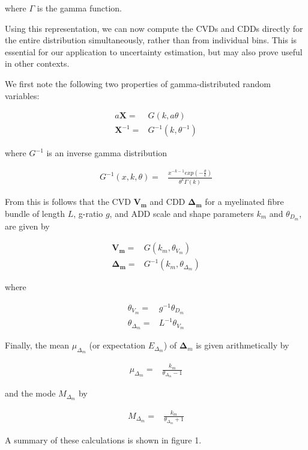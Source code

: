 where $\Gamma$ is the gamma function. 

Using this representation, we can now compute the CVDs and CDDs directly for the entire distribution simultaneously, rather than from individual bins. This is essential for our application to uncertainty estimation, but may also prove useful in other contexts.


We first note the following two properties of gamma-distributed random variables: 

\begin{eqnarray}
a \mathbf{X} =& G(k,a \theta ) \\
\mathbf{X}^{-1} =& G^{-1}(k,\theta^{-1} )
\end{eqnarray}

where $G^{-1}$ is an inverse gamma distribution

\begin{eqnarray}
G^{-1}(x,k,\theta) =& \frac{\displaystyle x^{-k-1} exp(- \frac{\displaystyle \theta}{ \displaystyle k})}{\displaystyle \theta^{k} \Gamma(k)} 
\end{eqnarray}

From this is follows that the CVD $\mathbf{V_m}$ and CDD $\mathbf{\Delta_m}$ for a myelinated fibre bundle of length $L$, g-ratio $g$, and ADD scale and shape parameters $k_m$ and $\theta_{D_{m}}$, are given by 

\begin{eqnarray}
\mathbf{V_m} =& G(k_m, \theta_{V_{m}}) \\
\mathbf{\Delta_m} =& G^{-1}(k_m, \theta_{\Delta_{m}})
\end{eqnarray}

where 

\begin{eqnarray}
\theta_{V{_m}} =& g^{-1} \theta_{D_{m}}  \\
\theta_{\Delta{_m}} =& L^{-1} \theta_{V_{m}}
\end{eqnarray}

Finally, the mean $\mu_{\Delta_m}$ (or expectation $E_{\Delta_m}$) of $\mathbf{\Delta}_m$ is given arithmetically by 

\begin{eqnarray}
\mu_{\Delta_m} =& \frac{\displaystyle k_m}{\displaystyle \theta_{\Delta_m} -1} \end{eqnarray}

and the mode $M_{\Delta_m}$ by 

\begin{eqnarray}
M_{\Delta_m} =& \frac{\displaystyle k_m}{\displaystyle \theta_{\Delta_m} +1}
\end{eqnarray}

A summary of these calculations is shown in figure 1. 


